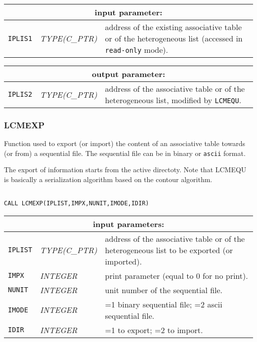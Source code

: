 \noindent
\begin{tabular}{|p{1.5cm}|p{3cm}|p{10cm}|}
\hline
\multicolumn{3}{|c|}{\bf input parameter:} \\
\hline
{\tt IPLIS1} & {\it TYPE(C\_PTR)} & address of the existing associative table or of the heterogeneous list
                                    (accessed in {\tt read-only} mode). \\
\hline
\end{tabular}

\vskip 0.8cm

\noindent
\begin{tabular}{|p{1.5cm}|p{3cm}|p{10cm}|}
\hline
\multicolumn{3}{|c|}{\bf output parameter:} \\
\hline
{\tt IPLIS2} & {\it TYPE(C\_PTR)} & address of the associative table or of the heterogeneous list, modified by {\tt LCMEQU}. \\
\hline
\end{tabular}

\subsubsection{LCMEXP}

Function used to export (or import) the content of an associative table towards (or from) a sequential file. The sequential file
can be in binary or {\tt ascii} format.

\vskip 0.4cm

The export of information starts from the active directoty. Note that {LCMEQU} is basically a serialization algorithm
based on the contour algorithm.

\begin{verbatim}

CALL LCMEXP(IPLIST,IMPX,NUNIT,IMODE,IDIR)
\end{verbatim}

\noindent
\begin{tabular}{|p{1.5cm}|p{3cm}|p{10cm}|}
\hline
\multicolumn{3}{|c|}{\bf input parameters:} \\
\hline
{\tt IPLIST} & {\it TYPE(C\_PTR)} & address of the associative table or of the heterogeneous list to be exported (or imported). \\
\hline
{\tt IMPX} & {\it INTEGER} & print parameter (equal to 0 for no print). \\
\hline
{\tt NUNIT} & {\it INTEGER} & unit number of the sequential file. \\
\hline
{\tt IMODE} & {\it INTEGER} & =1 binary sequential file; 
                              =2 {\sc ascii} sequential file. \\
\hline
{\tt IDIR} & {\it INTEGER} & =1 to export; =2 to import. \\
\hline
\end{tabular}

